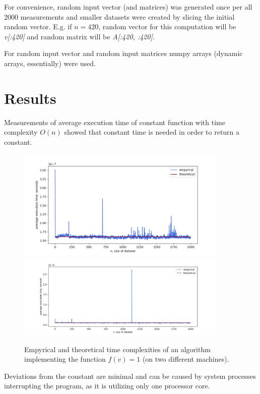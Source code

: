 \documentclass[12pt, a4paper]{article}
\begin{document}
For convenience, random input vector (and matrices) was generated once per all 2000 measurements and smaller datasets were created by slicing the initial random vector. E.g. if $n=420$, random vector for this computation will be \textit{v[:420]} and random matrix will be \textit{A[:420, :420]}.

For random input vector and random input matrices numpy arrays (dynamic arrays, essentially) were used.

\newpage

\section*{Results}

Measurements of average execution time of constant function with time complexity $O(n)$ showed that constant time is needed in order to return a constant.
\begin{figure}[!h]
\centering
\includegraphics[width=0.9\textwidth]{const.png}
\includegraphics[width=0.9\textwidth]{valeria/const.png}
\caption{Empyrical and theoretical time complexities of an algorithm implementing the function $f(v)=1$ (on two different machines).}
\end{figure}

Deviations from the constant are minimal and can be caused by system processes interrupting the program, as it is utilizing only one processor core.
\end{document}
